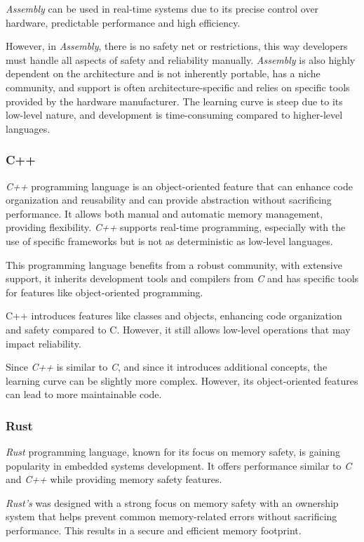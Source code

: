\textit{Assembly} can be used in real-time systems due to its precise control over hardware, predictable performance and high efficiency.

However, in \textit{Assembly}, there is no safety net or restrictions, this way developers must handle all aspects of safety and reliability manually.
\textit{Assembly} is also highly dependent on the architecture and is not inherently portable, has a niche community, and support is often architecture-specific and relies on specific tools provided by the hardware manufacturer.
The learning curve is steep due to its low-level nature, and development is time-consuming compared to higher-level languages.

\subsubsection{C++}
\textit{C++} programming language is an object-oriented feature that can enhance code organization and reusability and can provide abstraction without sacrificing performance.
It allows both manual and automatic memory management, providing flexibility.
\textit{C++} supports real-time programming, especially with the use of specific frameworks but is not as deterministic as low-level languages.

This programming language benefits from a robust community, with extensive support, it inherits development tools and compilers from \textit{C} and has specific tools for features like object-oriented programming.

C++ introduces features like classes and objects, enhancing code organization and safety compared to C.
However, it still allows low-level operations that may impact reliability.

Since \textit{C++} is similar to \textit{C}, and since it introduces additional concepts, the learning curve can be slightly more complex.
However, its object-oriented features can lead to more maintainable code.

\subsubsection{Rust}
\textit{Rust} programming language, known for its focus on memory safety, is gaining popularity in embedded systems development.
It offers performance similar to \textit{C} and \textit{C++} while providing memory safety features.

\textit{Rust's} was designed with a strong focus on memory safety with an ownership system that helps prevent common memory-related errors without sacrificing performance.
This results in a secure and efficient memory footprint.


